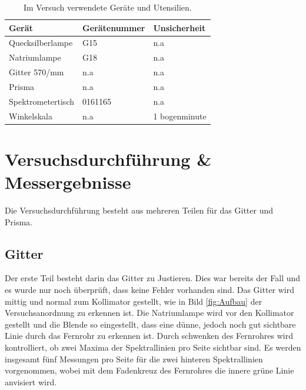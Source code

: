\documentclass[12pt,a4paper,twoside]{article}
\begin{document}
    \begin{table}[H]
        \centering
        \caption{Im Versuch verwendete Geräte und Utensilien.}
        \label{tab:geraete}
        \begin{tabular}{| l | l | l |}
            \hline
            Gerät  & Gerätenummer  & Unsicherheit \\
            \hline
            Quecksilberlampe & G15 & {n.a} \\
            Natriumlampe & G18 & {n.a} \\
            Gitter 570/mm & {n.a} & {n.a} \\
            Prisma & {n.a} & {n.a} \\
            Spektrometertisch & 0161165 & {n.a} \\
            Winkelskala & {n.a} & 1 bogenminute \\
            \hline
        \end{tabular}
    \end{table}


\section{Versuchsdurchführung \& Messergebnisse} %
Die Versuchsdurchführung besteht aus mehreren Teilen für das Gitter und Prisma. 

\subsection{Gitter}

Der erste Teil besteht darin das Gitter zu Justieren. Dies war bereits der Fall und es wurde nur noch überprüft, dass keine Fehler vorhanden sind. Das Gitter wird mittig und normal zum Kollimator gestellt, wie in Bild \ref{fig:Aufbau} der Versuchsanordnung zu erkennen ist. 
Die Natriumlampe wird vor den Kollimator gestellt und die Blende so eingestellt, dass eine dünne, jedoch noch gut sichtbare Linie durch das Fernrohr zu erkennen ist. 
Durch schwenken des Fernrohres wird kontrolliert, ob zwei Maxima der Spektrallinien pro Seite sichtbar sind. 
Es werden insgesamt fünf Messungen pro Seite für die zwei hinteren Spektrallinien vorgenommen, wobei mit dem Fadenkreuz des Fernrohres die innere grüne Linie anvisiert wird. 
\end{document}

